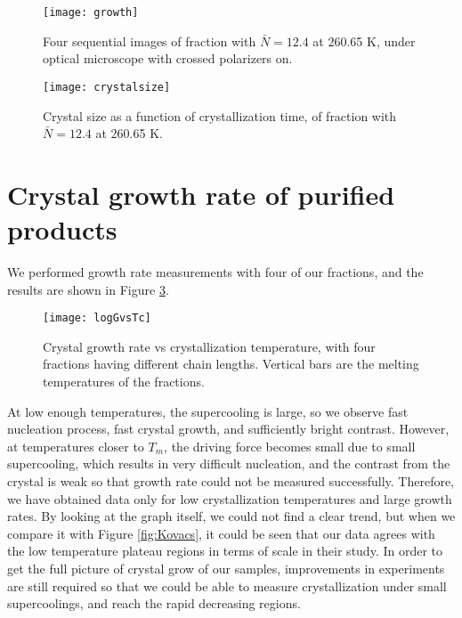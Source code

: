 \begin{figure}[H]
\center
\vspace{1 cm}
\texttt{[image: growth]}
\caption{Four sequential images of fraction with $\bar{N} = 12.4$ at 260.65 K, under optical microscope with crossed polarizers on.}
\label{fig:growth}
\end{figure}

\begin{figure}[H]
	\center
	\vspace{1 cm}
	\texttt{[image: crystalsize]}
	\caption{Crystal size as a function of crystallization time, of fraction with $\bar{N} = 12.4$ at 260.65 K.}
	\label{fig:crystal size}
\end{figure}

\section{Crystal growth rate of purified products}

We performed growth rate measurements with four of our fractions, and the results are shown in Figure \ref{fig:logGvsTc}.

\begin{figure}[H]
	\center
	\vspace{1 cm}
	\texttt{[image: logGvsTc]}
	\caption{Crystal growth rate vs crystallization temperature, with four fractions having different chain lengths. Vertical bars are the melting temperatures of the fractions.}
	\label{fig:logGvsTc}
\end{figure}

At low enough temperatures, the supercooling is large, so we observe fast nucleation process, fast crystal growth, and sufficiently bright contrast. However, at temperatures closer to $T_{m}$, the driving force becomes small due to small supercooling, which results in very difficult nucleation, and the contrast from the crystal is weak so that growth rate could not be measured successfully. Therefore, we have obtained data only for low crystallization temperatures and large growth rates. By looking at the graph itself, we could not find a clear trend, but when we compare it with Figure \ref{fig:Kovacs}, it could be seen that our data agrees with the low temperature plateau regions in terms of scale in their study. In order to get the full picture of crystal grow of our samples, improvements in experiments are still required so that we could be able to measure crystallization under small supercoolings, and reach the rapid decreasing regions.